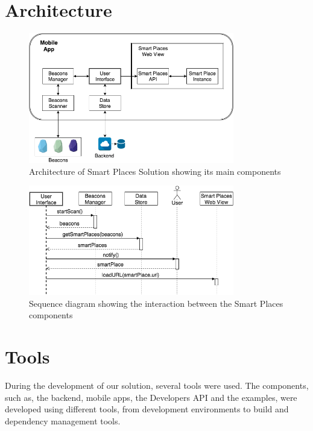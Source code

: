 \section{Architecture}
\label{sec:implementation_architecture}
\begin{figure}[!ht]
  \centering
    \includegraphics[width=0.8\textwidth, keepaspectratio]{images/smart_places_architecture}
    \caption[Smart Places Solution Architecture]{Architecture of Smart Places Solution showing its main components}
    \label{fig:estimote}
\end{figure}

\begin{figure}[!ht]
  \centering
    \includegraphics[width=0.8\textwidth, keepaspectratio]{images/client_app_sequence}
    \caption[Smart Places Sequence Diagram]{Sequence diagram showing the interaction between the Smart Places components}
    \label{fig:estimote}
\end{figure}

\section{Tools}
\label{sec:implementation_tools}
During the development of our solution, several tools were used.
The components, such as, the backend, mobile apps, the Developers \gls{API} and the examples, were developed using different tools, from development environments to build and dependency management tools.

